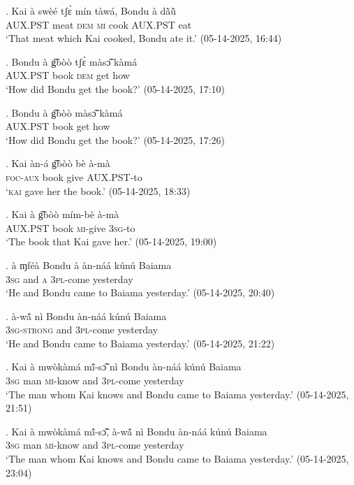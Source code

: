 \documentclass{assets/fieldnotes}
\begin{document}
\exg. Kai à swèé tʃɛ̀ mín tàwá, Bondu à dã̀ũ̀\\
{} \textsc{AUX.PST} meat \textsc{dem} \textsc{mi} cook {} \textsc{AUX.PST} eat \\
`That meat which Kai cooked, Bondu ate it.’ \hfill{(05-14-2025, 16:44)}

\exg. Bondu à g͡bòò tʃɛ̀ màsɔ̃̌ kàmá\\
{} \textsc{AUX.PST} book \textsc{dem} get how\\
`How did Bondu get the book?’ \hfill{(05-14-2025, 17:10)}

\exg. Bondu à g͡bòò màsɔ̃̌ kàmá\\
{} \textsc{AUX.PST} book get how\\
`How did Bondu get the book?’ \hfill{(05-14-2025, 17:26)}

\exg. Kai àn-á g͡bòò bè à-mà\\
{} \textsc{foc}-\textsc{aux} book give \textsc{AUX.PST}-to\\
`\textsc{kai} gave her the book.’ \hfill{(05-14-2025, 18:33)}

\exg. Kai à g͡bòò mím-bè à-mà\\
{} \textsc{AUX.PST} book \textsc{mi}-give \textsc{3sg}-to\\
`The book that Kai gave her.’ \hfill{(05-14-2025, 19:00)}

\exg. à ɱféà Bondu à àn-náá kúnú Baiama\\
\textsc{3sg} and {} \textsc{a} \textsc{3pl}-come yesterday {}\\
`He and Bondu came to Baiama yesterday.’ \hfill{(05-14-2025, 20:40)}

\exg. à-wã́ nì Bondu àn-náá kúnú Baiama\\
\textsc{3sg-strong} and {} \textsc{3pl}-come yesterday {}\\
`He and Bondu came to Baiama yesterday.’ \hfill{(05-14-2025, 21:22)}

\exg. Kai à mwòkàmá mĩ́-sɔ̃̂ nì Bondu àn-náá kúnú Baiama\\
{} \textsc{3sg} man \textsc{mi}-know and {} \textsc{3pl}-come yesterday {}\\
`The man whom Kai knows and Bondu came to Baiama yesterday.’ \hfill{(05-14-2025, 21:51)}

\exg. Kai à mwòkàmá mĩ́-sɔ̃̂, à-wã́ nì Bondu àn-náá kúnú Baiama\\
{} \textsc{3sg} man \textsc{mi}-know and {} \textsc{3pl}-come yesterday {}\\
`The man whom Kai knows and Bondu came to Baiama yesterday.’ \hfill{(05-14-2025, 23:04)}
\end{document}
